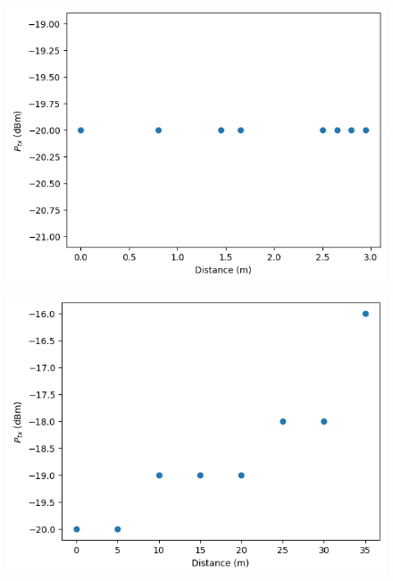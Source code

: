 \begin{figure}[H]
\begin{minipage}[t]{0.5\textwidth}
      \label{fig:home_distance_vs_txpower_mcm}
  \end{minipage}
\end{figure}

\begin{figure}[H]
  \centering
  \begin{minipage}[t]{0.5\textwidth}
      \centering
      \includegraphics[width=1\linewidth]{images/research_results/distance-vs-transmission-power/ga/lab-distance-vs-txpower.png}
      \label{fig:lab_distance_vs_txpower_ga}
  \end{minipage}\hfill
  \begin{minipage}[t]{0.5\textwidth}
      \centering
      \includegraphics[width=1\linewidth]{images/research_results/distance-vs-transmission-power/ga/home-distance-vs-txpower.png}
      \label{fig:home_distance_vs_txpower_ga}
  \end{minipage}
\end{figure}

